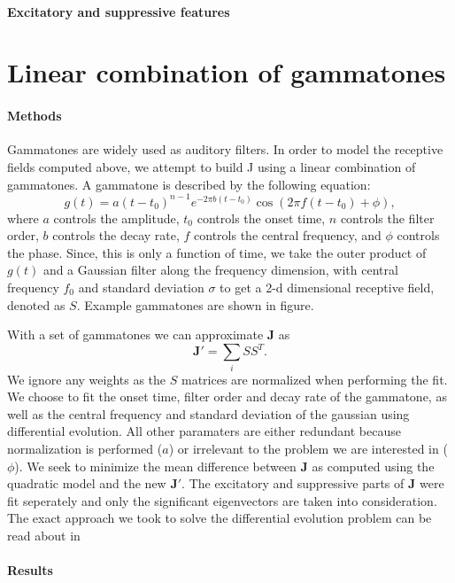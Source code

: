 \documentclass{article}
\begin{document}
\paragraph{Excitatory and suppressive features}

\section{Linear combination of gammatones}
\paragraph{Methods}
Gammatones are widely used as auditory filters. In order to model the receptive fields computed above, we attempt to build J using a linear combination of gammatones. A gammatone is described by the following equation:$$g(t) = a(t-t_0)^{n-1}e^{-2\pi b(t-t_0)}\cos({2\pi f (t-t_0) + \phi}),
$$ where $a$ controls the amplitude, $t_0$ controls the onset time, $n$ controls the filter order, $b$ controls the decay rate, $f$ controls the central frequency, and $\phi$ controls the phase. Since, this is only a function of time, we take the outer product of $g(t)$ and a Gaussian filter along the frequency dimension, with central frequency $f_0$ and standard deviation $\sigma$ to get a 2-d dimensional receptive field, denoted as $S$. Example gammatones are shown in figure. %

With a set of gammatones we can approximate $\mathbf{J}$ as $$\mathbf{J'} = \sum_{i}{SS^T}.$$ We ignore any weights as the $S$ matrices are normalized when performing the fit. We choose to fit the onset time, filter order and decay rate of the gammatone, as well as the central frequency and standard deviation of the gaussian using differential evolution. All other paramaters are either redundant because normalization is performed ($a$) or irrelevant to the problem we are interested in ($\phi$).  We seek to minimize the mean difference between $\mathbf{J}$ as computed using the quadratic model and the new $\mathbf{J'}$. The excitatory and suppressive parts of $\mathbf{J}$ were fit seperately and only the significant eigenvectors are taken into consideration. The exact approach we took to solve the differential evolution problem can be read about in %

\paragraph{Results}
\end{document}
